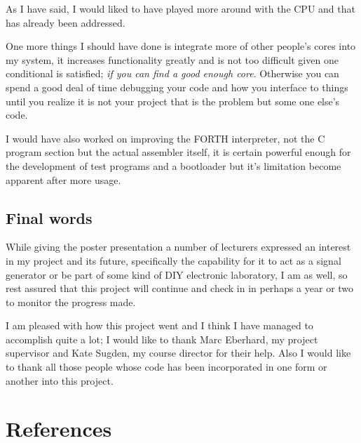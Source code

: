 \documentclass	[a4paper, 10pt]	{article}
\begin{document}
    As I have said, I would liked to have played more around with the CPU and that has
    already been addressed.

    One more things I should have done is integrate more of other people's cores into
    my system, it increases functionality greatly and is not too difficult given one
    conditional is satisfied; \emph{if you can find a good enough core}. Otherwise you
    can spend a good deal of time debugging your code and how you interface to things
    until you realize it is not your project that is the problem but some one else's
    code.

    I would have also worked on improving the FORTH interpreter, not the C program
    section but the actual assembler itself, it is certain powerful enough for the
    development of test programs and a bootloader but it's limitation become apparent
    after more usage.

    \subsection{Final words}

    While giving the poster presentation a number of lecturers expressed an interest
    in my project and its future, specifically the capability for it to act as a
    signal generator or be part of some kind of DIY electronic laboratory, I am as well,
    so rest assured that this project will continue and check in in perhaps a year or 
    two to monitor the progress made.

    I am pleased with how this project went and I think I have managed to accomplish
    quite a lot; I would like to thank Marc Eberhard, my project supervisor and Kate
    Sugden, my course director for their help. Also I would like to thank all those
    people whose code has been incorporated in one form or another into this project.

  \section{References}
\end{document}
